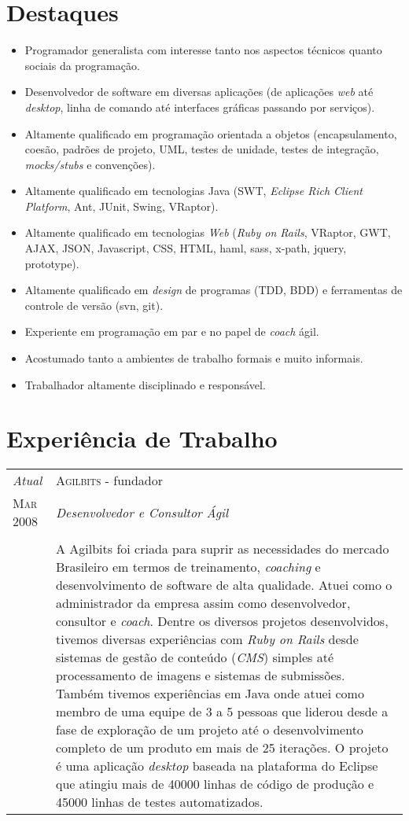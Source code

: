 \documentclass[letter,10pt]{article}
\begin{document}
\section{Destaques}

\begin{itemize}
\item Programador generalista com interesse tanto nos aspectos
  técnicos quanto sociais da programação.
\item Desenvolvedor de software em diversas aplicações (de aplicações
  \textit{web} até \textit{desktop}, linha de comando até interfaces
  gráficas passando por serviços).
\item Altamente qualificado em programação orientada a objetos
  (encapsulamento, coesão, padrões de projeto, UML, testes de unidade,
  testes de integração, \textit{mocks/stubs} e convenções).
\item Altamente qualificado em tecnologias Java (SWT, \textit{Eclipse
    Rich Client Platform}, Ant, JUnit, Swing, VRaptor).
\item Altamente qualificado em tecnologias \textit{Web} (\textit{Ruby
    on Rails}, VRaptor, GWT, AJAX, JSON, Javascript, CSS, HTML, haml,
  sass, x-path, jquery, prototype).
\item Altamente qualificado em \textit{design} de programas (TDD, BDD)
  e ferramentas de controle de versão (svn, git).
\item Experiente em programação em par e no papel de \textit{coach}
  ágil.
\item Acostumado tanto a ambientes de trabalho formais e muito
  informais.
\item Trabalhador altamente disciplinado e responsável.
\end{itemize}

\section{Experiência de Trabalho}

\begin{tabular}{p{2.5cm}|p{13.5cm}}
  \emph{Atual} & \textsc{Agilbits} - fundador\\
  \textsc{Mar 2008}& \emph{Desenvolvedor e Consultor Ágil}\\
  &\\
  &A Agilbits foi criada para suprir as necessidades do mercado
  Brasileiro em termos de treinamento, \textit{coaching} e
  desenvolvimento de software de alta qualidade. Atuei como o
  administrador da empresa assim como desenvolvedor, consultor e
  \textit{coach}.
  Dentre os diversos projetos desenvolvidos, tivemos diversas
  experiências com \textit{Ruby on Rails} desde sistemas de gestão de
  conteúdo (\textit{CMS}) simples até processamento de imagens e
  sistemas de submissões.
  Também tivemos experiências em Java onde atuei como membro de uma
  equipe de 3 a 5 pessoas que liderou desde a fase de exploração de
  um projeto até o desenvolvimento completo de um produto em mais de
  25 iterações. O projeto é uma aplicação \textit{desktop} baseada na
  plataforma do Eclipse que atingiu mais de 40000 linhas de código de
  produção e 45000 linhas de testes automatizados.
\end{tabular}
\end{document}
